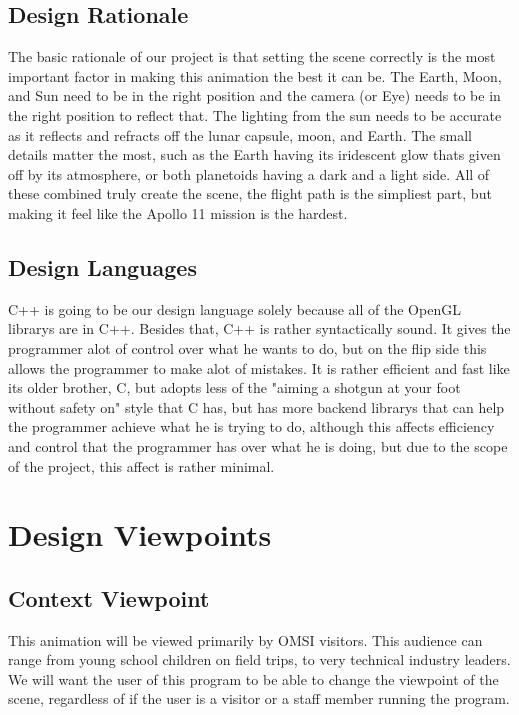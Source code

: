 \documentclass[onecolumn, draftclsnofoot,10pt, compsoc]{IEEEtran}
\begin{document}
    \subsection{Design Rationale}
	The basic rationale of our project is that setting the scene correctly is the most important factor in making this animation the best it can be. The Earth, Moon, and Sun need to be in the right position and the camera (or Eye) needs to be in the right position to reflect that. The lighting from the sun needs to be accurate as it reflects and refracts off the lunar capsule, moon, and Earth. The small details matter the most, such as the Earth having its iridescent glow thats given off by its atmosphere, or both planetoids having a dark and a light side. All of these combined truly create the scene, the flight path is the simpliest part, but making it feel like the Apollo 11 mission is the hardest.
    \subsection{Design Languages}
	C++ is going to be our design language solely because all of the OpenGL librarys are in C++. Besides that, C++ is rather syntactically sound. It gives the programmer alot of control over what he wants to do, but on the flip side this allows the programmer to make alot of mistakes. It is rather efficient and fast like its older brother, C, but adopts less of the "aiming a shotgun at your foot without safety on" style that C has, but has more backend librarys that can help the programmer achieve what he is trying to do, although this affects efficiency and control that the programmer has over what he is doing, but due to the scope of the project, this affect is rather minimal. 


\section{Design Viewpoints}

    \subsection{Context Viewpoint}
    
    This animation will be viewed primarily by OMSI visitors. This audience can range from young school children on field trips, to very technical industry leaders. We will want the user of this program to be able to change the viewpoint of the scene, regardless of if the user is a visitor or a staff member running the program.  
    
\end{document}
